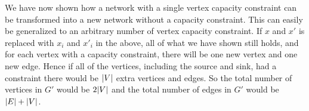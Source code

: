 We have now shown how a network with a single vertex capacity constraint can be transformed into a new network without a capacity constraint. This can easily be generalized to an arbitrary number of vertex capacity constraint. If $x$ and $x'$ is replaced with $x_i$ and $x'_i$ in the above, all of what we have shown still holds, and for each vertex with a capacity constraint, there will be one new vertex and one new edge. Hence if all of the vertices, including the source and sink, had a constraint there would be $\lvert V\rvert$ extra vertices and edges. So the total number of vertices in $G'$ would be $2\lvert V\rvert$ and the total number of edges in $G'$ would be $\lvert E\rvert+\lvert V\rvert$.